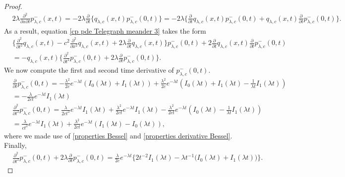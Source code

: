 \documentclass{article}
\theoremstyle{definition}
\numberwithin{equation}{section}
\begin{document}
\begin{proof}
\begin{align*}
&2\lambda\frac{\partial^2}{\partial x\partial t}p^{-}_{\lambda,c}(x,t) = -2\lambda \frac{\partial}{\partial t}\Big\{q_{\lambda,c}(x,t)p^{-}_{\lambda,c}(0,t)\Big\}=-2\lambda\big\{\frac{\partial}{\partial t}q_{\lambda,c}(x,t)p^{-}_{\lambda,c}(0,t)+q_{\lambda,c}(x,t)\frac{\partial}{\partial t}p^{-}_{\lambda,c}(0,t)\big\}.
\end{align*}
As a result, equation \eqref{cp pde Telegraph meander 3} takes the form 
\begin{align}\label{cp pde Telegraph meander 5}
&\Big\{\frac{\partial^2}{\partial t^2}q_{\lambda,c}(x,t)-c^2\frac{\partial^2}{\partial x^2}q_{\lambda,c}(x,t)+2\lambda\frac{\partial}{\partial t}q_{\lambda,c}(x,t)\Big\}p^{-}_{\lambda,c}(0,t)+2\frac{\partial}{\partial t}q_{\lambda,c}(x,t)\frac{\partial}{\partial t}p^{-}_{\lambda,c}(0,t)\nonumber \\
&=-q_{\lambda,c}(x,t)\big\{\frac{\partial^2}{\partial t^2}p^{-}_{\lambda,c}(0,t)+2\lambda\frac{\partial}{\partial t}p^{-}_{\lambda,c}(0,t)\big\}.
\end{align}
We now compute the first and second time derivative of $p^{-}_{\lambda,c}(0,t)$. 
\begin{align}
&\frac{\partial}{\partial t}p^{-}_{\lambda,c}(0,t) = -\frac{\lambda^2}{2c}e^{-\lambda t}(I_0(\lambda t)+I_1(\lambda t))+\frac{\lambda^2}{2c}e^{-\lambda t}(I_0(\lambda t)+I_1(\lambda t)-\frac{1}{\lambda t}I_1(\lambda t)) \nonumber\\
&=-\frac{\lambda}{2ct}e^{-\lambda t}I_1(\lambda t) \label{First Derivative p-}\\
&\frac{\partial^2}{\partial t^2}p^{-}_{\lambda,c}(0,t) = \frac{\lambda}{2ct^2}e^{-\lambda t}I_1(\lambda t)+\frac{\lambda^2}{2ct}e^{-\lambda t}I_1(\lambda t)-\frac{\lambda^2}{2ct}e^{-\lambda t}(I_0(\lambda t)-\frac{1}{\lambda t}I_1(\lambda t)) \nonumber\\&=\frac{\lambda}{ct^2}e^{-\lambda t}I_1(\lambda t)+\frac{\lambda^2}{2ct}e^{-\lambda t}(I_1(\lambda t)-I_0(\lambda t)) \label{Second Derivative p-} ,\end{align}
where we made use of \eqref{properties Bessel} and \eqref{properties derivative Bessel}. Finally,
\begin{align}\label{cp Telegraph meander 6}
&\frac{\partial^2}{\partial t^2}p^{-}_{\lambda,c}(0,t)+2\lambda\frac{\partial}{\partial t}p^{-}_{\lambda,c}(0,t) = \frac{\lambda}{2c}e^{-\lambda t}\big\{2t^{-2}I_1(\lambda t)-\lambda t^{-1}\big(I_0(\lambda t)+I_1(\lambda t)\big)\big\}.
\end{align}

\end{proof}
\end{document}
